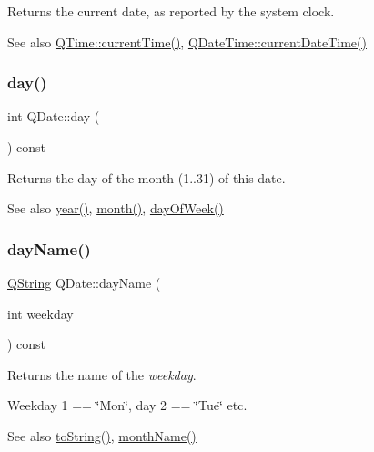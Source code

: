Returns the current date, as reported by the system clock.

\begin{DoxySeeAlso}{See also}
\mbox{\hyperlink{class_q_time_a39b156ef7067e581f9fd70de6ef9ea4d}{Q\+Time\+::current\+Time()}}, \mbox{\hyperlink{class_q_date_time_a1e8e27c71617d5c97abe80ee2426a1b4}{Q\+Date\+Time\+::current\+Date\+Time()}} 
\end{DoxySeeAlso}
\mbox{\label{class_q_date_a4da6cc4ed155922c376d61102ffcb372}} 
\subsubsection{\texorpdfstring{day()}{day()}}
{\footnotesize\ttfamily int Q\+Date\+::day (\begin{DoxyParamCaption}{ }\end{DoxyParamCaption}) const}

Returns the day of the month (1..31) of this date.

\begin{DoxySeeAlso}{See also}
\mbox{\hyperlink{class_q_date_a7ad4fc16e91f089391a4ea9710076839}{year()}}, \mbox{\hyperlink{class_q_date_a42aa3a5238c1dd81848e0bf690b3dce5}{month()}}, \mbox{\hyperlink{class_q_date_ae69fd6a7673886fc31ce220ef2137d39}{day\+Of\+Week()}} 
\end{DoxySeeAlso}
\mbox{\label{class_q_date_a08320176a833c05ff718155da1177381}} 
\subsubsection{\texorpdfstring{dayName()}{dayName()}}
{\footnotesize\ttfamily \mbox{\hyperlink{class_q_string}{Q\+String}} Q\+Date\+::day\+Name (\begin{DoxyParamCaption}\item[{int}]{weekday }\end{DoxyParamCaption}) const\hspace{0.3cm}{\ttfamily [virtual]}}

Returns the name of the {\itshape weekday}.

Weekday 1 == \char`\"{}\+Mon\char`\"{}, day 2 == \char`\"{}\+Tue\char`\"{} etc.

\begin{DoxySeeAlso}{See also}
\mbox{\hyperlink{class_q_date_aebc53b28c073570214cfc6f1376cbcd5}{to\+String()}}, \mbox{\hyperlink{class_q_date_afa5fcbf8ec6629175873dd50cbc3da4c}{month\+Name()}} 
\end{DoxySeeAlso}
\mbox{\label{class_q_date_ae69fd6a7673886fc31ce220ef2137d39}} 
